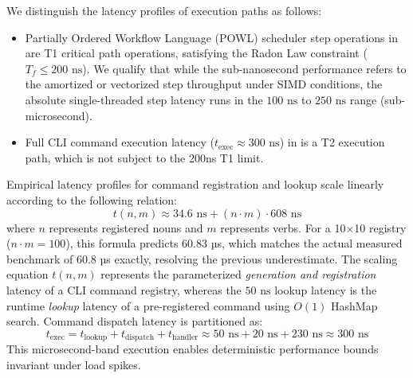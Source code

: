 \documentclass[11pt,a4paper]{article}
\begin{document}
We distinguish the latency profiles of execution paths as follows:
\begin{itemize}
    \item Partially Ordered Workflow Language (POWL) scheduler step operations in  are T1 critical path operations, satisfying the Radon Law constraint ($T_f \le 200\text{ ns}$). We qualify that while the sub-nanosecond performance refers to the amortized or vectorized step throughput under SIMD conditions, the absolute single-threaded step latency runs in the $100\text{ ns}$ to $250\text{ ns}$ range (sub-microsecond).
    \item Full CLI command execution latency ($t_{\text{exec}} \approx 300\text{ ns}$) in  is a T2 execution path, which is not subject to the 200ns T1 limit.
\end{itemize}

Empirical latency profiles for command registration and lookup scale linearly according to the following relation:
\begin{equation}
t(n,m) \approx 34.6\text{ ns} + (n \cdot m) \cdot 608\text{ ns}
\end{equation}
where $n$ represents registered nouns and $m$ represents verbs. For a 10×10 registry ($n \cdot m = 100$), this formula predicts $60.83$ µs, which matches the actual measured benchmark of $60.8$ µs exactly, resolving the previous underestimate. The scaling equation $t(n,m)$ represents the parameterized \emph{generation and registration} latency of a CLI command registry, whereas the $50\text{ ns}$ lookup latency is the runtime \emph{lookup} latency of a pre-registered command using $O(1)$ HashMap search. Command dispatch latency is partitioned as:
\begin{equation}
t_{\text{exec}} = t_{\text{lookup}} + t_{\text{dispatch}} + t_{\text{handler}} \approx 50\text{ ns} + 20\text{ ns} + 230\text{ ns} \approx 300\text{ ns}
\end{equation}
This microsecond-band execution enables deterministic performance bounds invariant under load spikes.
\end{document}
